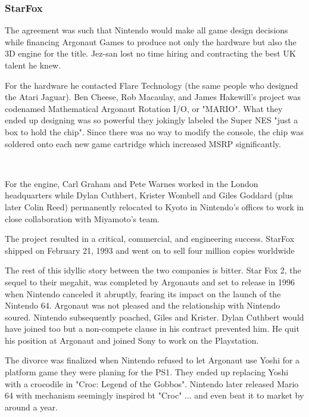 \subsubsection{StarFox}
The agreement was such that Nintendo would make all game design decisions while financing Argonaut Games to produce not only the hardware but also the 3D engine for the title. Jez-san lost no time hiring and contracting the best UK talent he knew.\\
\par
For the hardware he contacted Flare Technology (the same people who designed the Atari Jaguar). Ben Cheese, Rob Macaulay, and James Hakewill's project was codenamed Mathematical Argonaut Rotation I/O, or "MARIO". What they ended up designing was so powerful they jokingly labeled the Super NES "just a box to hold the chip". Since there was no way to modify the console, the chip was soldered onto each new game cartridge which increased MSRP significantly.\\
\par
{}\\
\par
For the engine, Carl Graham and Pete Warnes worked in the London headquarters while Dylan Cuthbert, Krister Wombell and Giles Goddard (plus later Colin Reed) permanently relocated to Kyoto in Nintendo's offices to work in close collaboration with Miyamoto's team.\\ 
\par
The project resulted in a critical, commercial, and engineering success. StarFox shipped on February 21, 1993 and went on to sell four million copies worldwide\\
 \par

The rest of this idyllic story between the two companies is bitter. Star Fox 2, the sequel to their megahit, was completed by Argonauts and set to release in 1996 when Nintendo canceled it abruptly, fearing its impact on the launch of the Nintendo 64. Argonaut was not pleased and the relationship with Nintendo soured. Nintendo subsequently poached, Giles and Krister. Dylan Cuthbert would have joined too but a non-compete clause in his contract prevented him. He quit his position at Argonaut and joined Sony to work on the Playstation.\\
\par
The divorce was finalized when Nintendo refused to let Argonaut use Yoshi for a platform game they were planing for the PS1. They ended up replacing Yoshi with a crocodile in "Croc: Legend of the Gobbos". Nintendo later released Mario 64 with mechanism seemingly inspired bt "Croc" ... and even beat it to market by around a year.





